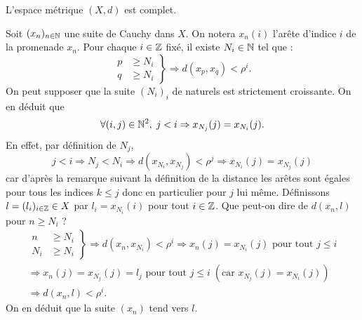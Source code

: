 \begin{propn}\label{Prop:PromComplet}
 L'espace métrique $(X,d)$ est complet.
\end{propn}
\begin{demo}
 Soit $(x_n)_{n\in \mathbb{N}}$ une suite de Cauchy dans $X$. On notera $x_n(i)$ l'arête d'indice $i$ de la promenade $x_n$.\newline
 Pour chaque $i\in \mathbb{Z}$ fixé, il existe $N_i \in \mathbb{N}$ tel que :
 \begin{displaymath}
 \left.
 \begin{aligned}
   p &\geq N_i \\
   q &\geq N_i
 \end{aligned}
 \right\rbrace
 \Rightarrow
  d(x_p,x_q) < \rho^i.
 \end{displaymath}
On peut supposer que la suite $(N_i)_i$ de naturels est strictement croissante. On en déduit que
\begin{displaymath}
 \forall (i,j) \in \mathbb{N}^2, \; j < i \Rightarrow x_{N_j}(j) = x_{N_i}(j).
\end{displaymath}
En effet, par définition de $N_j$,
\begin{displaymath}
 j< i \Rightarrow N_j < N_i \Rightarrow d(x_{N_i},x_{N_j}) < \rho^j
 \Rightarrow x_{N_i}(j) = x_{N_j}(j)
\end{displaymath}
car d'après la remarque suivant la définition de la distance les arêtes sont égales pour tous les indices $k\leq j$ donc en particulier pour $j$ lui même.\newline
Définissons $l=(l_i)_{i\in \mathbb{Z}} \in X$ par $l_i = x_{N_i}(i)$ pour tout $i\in \mathbb{Z}$.\newline
Que peut-on dire de $d(x_n,l)$ pour $n\geq N_i$ ?
\begin{multline*}
 \left.
 \begin{aligned}
  n &\geq N_i \\
  N_i &\geq N_i
 \end{aligned}
 \right\rbrace
 \Rightarrow
 d(x_n,x_{N_i}) < \rho^i
 \Rightarrow
 x_n(j) = x_{N_i}(j) \text{ pour tout } j \leq i \\
 \Rightarrow
 x_n(j) = x_{N_j}(j)=l_j \text{ pour tout } j \leq i \;\left(\text{car } x_{N_j}(j) = x_{N_i}(j)\right) \\
 \Rightarrow d(x_n,l) < \rho^i .
\end{multline*}
On en déduit que la suite $(x_n)$ tend vers $l$.
\end{demo}

